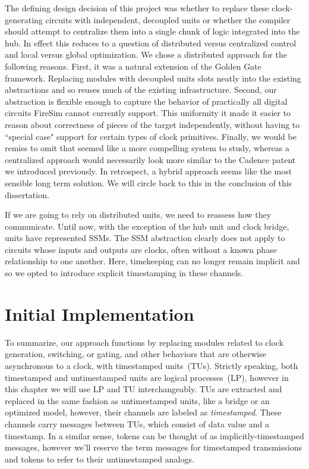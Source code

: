 The defining design decision of this project was whether to replace these
clock-generating circuits with independent, decoupled units or whether the
compiler should attempt to centralize them into a single chunk of logic
integrated into the hub. In effect this reduces to a question of distributed
versus centralized control and local versus global optimization. We chose a
distributed approach for the following reasons.  First, it was a natural
extension of the Golden Gate framework. Replacing modules with decoupled units
slots neatly into the existing abstractions and so reuses much of the existing
infrastructure. Second, our abstraction is flexible enough to capture the
behavior of practically all digital circuits FireSim cannot currently support.
This uniformity it made it easier to reason about correctness of pieces of the
target independently, without having to ``special case" support for certain
types of clock primitives.  Finally, we would be remiss to omit that seemed
like a more compelling system to study, whereas a centralized approach would
necessarily look more similar to the Cadence patent we introduced previously.
In retrospect, a hybrid approach seems like the most sensible long term
solution.  We will circle back to this in the conclusion of this dissertation.

If we are going to rely on distributed units, we need to reassess how they
communicate. Until now, with the exception of the hub unit and clock
bridge, units have represented SSMs. The SSM abstraction clearly does not apply to
circuits whose inputs and outputs are clocks, often without a known phase relationship to
one another.  Here, timekeeping can no longer remain implicit and so we
opted to introduce explicit timestamping in these channels.

\section{Initial Implementation}

To summarize, our approach functions by replacing modules related to clock
generation, switching, or gating, and other behaviors that are otherwise
asynchronous to a clock, with timestamped units~(TUs). Strictly speaking, both
timestamped and untimestamped units are logical processes~(LP), however in this
chapter we will use LP and TU interchangeably. TUs are
extracted and replaced in the same fashion as untimestamped units, like a
bridge or an optimized model, however, their channels are labeled as
\emph{timestamped}. These channels carry messages between TUs, which consist of
data value and a timestamp.  In a similar sense, tokens can be thought of as
implicitly-timestamped messages, however we'll reserve the term messages for
timestamped transmissions and tokens to refer to their untimestamped analogs.


